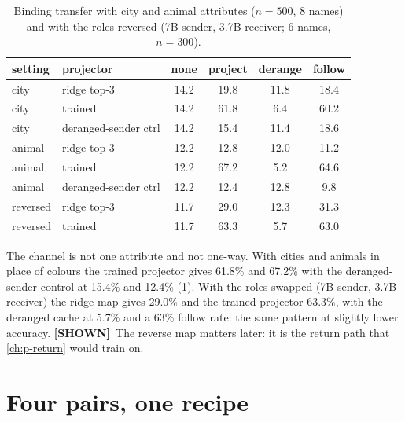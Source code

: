 \documentclass[11pt,a4paper]{report}
\newcommand{\SHOWN}{\textcolor{shownc}{\textbf{\scriptsize[SHOWN]}}}
\begin{document}
\begin{table}[h]
\caption{Binding transfer with city and animal attributes ($n = 500$, 8 names) and with the roles reversed (7B sender, 3.7B receiver; 6 names, $n = 300$).}
\label{tab:attrs}
\vskip 0.1in
\begin{center}
\begin{small}
\begin{tabular}{llcccc}
\toprule
setting & projector & none & project & derange & follow \\
\midrule
city   & ridge top-3            & 14.2 & 19.8 & 11.8 & 18.4 \\
city   & trained                & 14.2 & 61.8 & 6.4  & 60.2 \\
city   & deranged-sender ctrl   & 14.2 & 15.4 & 11.4 & 18.6 \\
animal & ridge top-3            & 12.2 & 12.8 & 12.0 & 11.2 \\
animal & trained                & 12.2 & 67.2 & 5.2  & 64.6 \\
animal & deranged-sender ctrl   & 12.2 & 12.4 & 12.8 & 9.8 \\
reversed & ridge top-3          & 11.7 & 29.0 & 12.3 & 31.3 \\
reversed & trained              & 11.7 & 63.3 & 5.7  & 63.0 \\
\bottomrule
\end{tabular}
\end{small}
\end{center}
\end{table}

The channel is not one attribute and not one-way. With cities and animals in place of colours the trained projector gives 61.8\% and 67.2\% with the deranged-sender control at 15.4\% and 12.4\% (\cref{tab:attrs}). With the roles swapped (7B sender, 3.7B receiver) the ridge map gives 29.0\% and the trained projector 63.3\%, with the deranged cache at 5.7\% and a 63\% follow rate: the same pattern at slightly lower accuracy. \SHOWN\ The reverse map matters later: it is the return path that \cref{ch:p-return} would train on.

\section{Four pairs, one recipe}
\end{document}

